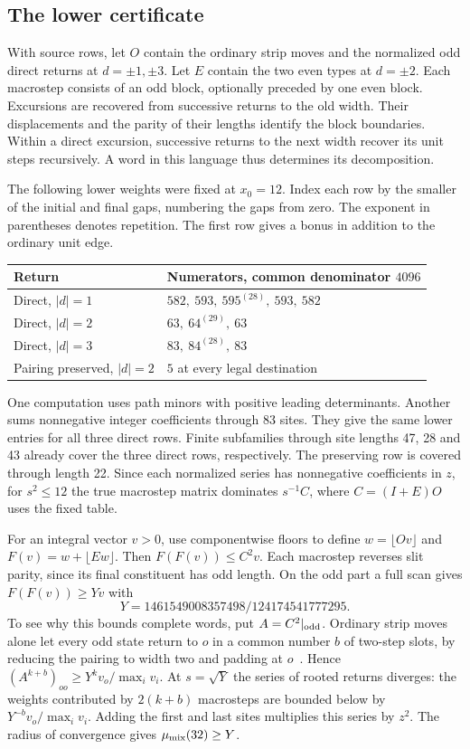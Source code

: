 \documentclass[11pt]{article}
\newcommand{\floor}[1]{\lfloor #1\rfloor}
\begin{document}
\subsection{The lower certificate}
With source rows, let \(O\) contain the ordinary strip moves and the normalized odd direct returns at \(d=\pm1,\pm3\). Let \(E\) contain the two even types at \(d=\pm2\). Each macrostep consists of an odd block, optionally preceded by one even block. Excursions are recovered from successive returns to the old width. Their displacements and the parity of their lengths identify the block boundaries. Within a direct excursion, successive returns to the next width recover its unit steps recursively. A word in this language thus determines its decomposition.

The following lower weights were fixed at \(x_0=12\). Index each row by the smaller of the initial and final gaps, numbering the gaps from zero. The exponent in parentheses denotes repetition. The first row gives a bonus in addition to the ordinary unit edge.
\begin{center}\begin{tabular}{ll}
\toprule Return & Numerators, common denominator \(4096\)\\\midrule
Direct, \(|d|=1\) & \(582,\ 593,\ 595^{(28)},\ 593,\ 582\)\\
Direct, \(|d|=2\) & \(63,\ 64^{(29)},\ 63\)\\
Direct, \(|d|=3\) & \(83,\ 84^{(28)},\ 83\)\\
Pairing preserved, \(|d|=2\) & \(5\) at every legal destination\\\bottomrule
\end{tabular}\end{center}
One computation uses path minors with positive leading determinants. Another sums nonnegative integer coefficients through 83 sites. They give the same lower entries for all three direct rows. Finite subfamilies through site lengths 47, 28 and 43 already cover the three direct rows, respectively. The preserving row is covered through length 22. Since each normalized series has nonnegative coefficients in \(z\), for \(s^2\le12\) the true macrostep matrix dominates \(s^{-1}C\), where \(C=(I+E)O\) uses the fixed table.

For an integral vector \(v>0\), use componentwise floors to define \(w=\floor{Ov}\) and \(F(v)=w+\floor{Ew}\). Then \(F(F(v))\le C^2v\). Each macrostep reverses slit parity, since its final constituent has odd length. On the odd part a full scan gives \(F(F(v))\ge Yv\) with
\[
        Y=1461549008357498/124174541777295 .
\]
To see why this bounds complete words, put \(A=C^2|_{\rm odd}\). Ordinary strip moves alone let every odd state return to \(o\) in a common number \(b\) of two-step slots, by reducing the pairing to width two and padding at \(o\)~\cite{arg}. Hence \((A^{k+b})_{oo}\ge Y^k v_o/\max_i v_i\). At \(s=\sqrt Y\) the series of rooted returns diverges: the weights contributed by \(2(k+b)\) macrosteps are bounded below by \(Y^{-b}v_o/\max_i v_i\). Adding the first and last sites multiplies this series by \(z^2\). The radius of convergence gives \(\mu_{\mathrm{mix}}(32)\ge Y\).
\end{document}
